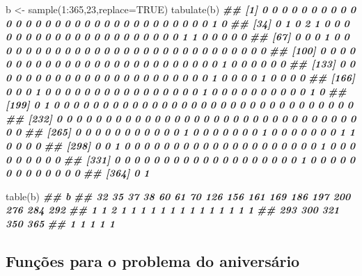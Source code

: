 \documentclass[
  11pt]{report}
\newenvironment{Shaded}{\begin{snugshade}}{\end{snugshade}}
\newcommand{\AttributeTok}[1]{\textcolor[rgb]{0.77,0.63,0.00}{#1}}
\newcommand{\ConstantTok}[1]{\textcolor[rgb]{0.00,0.00,0.00}{#1}}
\newcommand{\DecValTok}[1]{\textcolor[rgb]{0.00,0.00,0.81}{#1}}
\newcommand{\DocumentationTok}[1]{\textcolor[rgb]{0.56,0.35,0.01}{\textbf{\textit{#1}}}}
\newcommand{\FunctionTok}[1]{\textcolor[rgb]{0.00,0.00,0.00}{#1}}
\newcommand{\NormalTok}[1]{#1}
\newcommand{\OtherTok}[1]{\textcolor[rgb]{0.56,0.35,0.01}{#1}}
\newcommand{\SpecialCharTok}[1]{\textcolor[rgb]{0.00,0.00,0.00}{#1}}
\renewenvironment{Shaded}{
    \begin{mdframed}[%
      roundcorner=2pt,%
      innerleftmargin=5pt,%
      innerrightmargin=5pt,%
      topline=true,%
      leftline=true,%
      rightline=true,%
      bottomline=true,%
      linewidth=0.5pt,%
      linecolor=black!20,%
      backgroundcolor=black!2,%
      skipabove=2ex,%
      skipbelow=2.5ex%
    ]%
  }
  {
    \end{mdframed}
  }
\begin{document}
\begin{Shaded}
\begin{Highlighting}[]
\NormalTok{b }\OtherTok{\textless{}{-}} \FunctionTok{sample}\NormalTok{(}\DecValTok{1}\SpecialCharTok{:}\DecValTok{365}\NormalTok{,}\DecValTok{23}\NormalTok{,}\AttributeTok{replace=}\ConstantTok{TRUE}\NormalTok{)}
\FunctionTok{tabulate}\NormalTok{(b)}
\DocumentationTok{\#\#   [1] 0 0 0 0 0 0 0 0 0 0 0 0 0 0 0 0 0 0 0 0 0 0 0 0 0 0 0 0 0 0 0 1 0}
\DocumentationTok{\#\#  [34] 0 1 0 2 1 0 0 0 0 0 0 0 0 0 0 0 0 0 0 0 0 0 0 0 0 0 1 1 0 0 0 0 0}
\DocumentationTok{\#\#  [67] 0 0 0 1 0 0 0 0 0 0 0 0 0 0 0 0 0 0 0 0 0 0 0 0 0 0 0 0 0 0 0 0 0}
\DocumentationTok{\#\# [100] 0 0 0 0 0 0 0 0 0 0 0 0 0 0 0 0 0 0 0 0 0 0 0 0 0 0 1 0 0 0 0 0 0}
\DocumentationTok{\#\# [133] 0 0 0 0 0 0 0 0 0 0 0 0 0 0 0 0 0 0 0 0 0 0 0 1 0 0 0 0 1 0 0 0 0}
\DocumentationTok{\#\# [166] 0 0 0 1 0 0 0 0 0 0 0 0 0 0 0 0 0 0 0 0 1 0 0 0 0 0 0 0 0 0 0 1 0}
\DocumentationTok{\#\# [199] 0 1 0 0 0 0 0 0 0 0 0 0 0 0 0 0 0 0 0 0 0 0 0 0 0 0 0 0 0 0 0 0 0}
\DocumentationTok{\#\# [232] 0 0 0 0 0 0 0 0 0 0 0 0 0 0 0 0 0 0 0 0 0 0 0 0 0 0 0 0 0 0 0 0 0}
\DocumentationTok{\#\# [265] 0 0 0 0 0 0 0 0 0 0 0 1 0 0 0 0 0 0 0 1 0 0 0 0 0 0 0 1 1 0 0 0 0}
\DocumentationTok{\#\# [298] 0 0 1 0 0 0 0 0 0 0 0 0 0 0 0 0 0 0 0 0 0 0 0 1 0 0 0 0 0 0 0 0 0}
\DocumentationTok{\#\# [331] 0 0 0 0 0 0 0 0 0 0 0 0 0 0 0 0 0 0 0 1 0 0 0 0 0 0 0 0 0 0 0 0 0}
\DocumentationTok{\#\# [364] 0 1}
\end{Highlighting}
\end{Shaded}

\begin{Shaded}
\begin{Highlighting}[]
\FunctionTok{table}\NormalTok{(b)}
\DocumentationTok{\#\# b}
\DocumentationTok{\#\#  32  35  37  38  60  61  70 126 156 161 169 186 197 200 276 284 292 }
\DocumentationTok{\#\#   1   1   2   1   1   1   1   1   1   1   1   1   1   1   1   1   1 }
\DocumentationTok{\#\# 293 300 321 350 365 }
\DocumentationTok{\#\#   1   1   1   1   1}
\end{Highlighting}
\end{Shaded}

\hypertarget{funuxe7uxf5es-para-o-problema-do-aniversuxe1rio}{%
\subsection*{Funções para o problema do aniversário}\label{funuxe7uxf5es-para-o-problema-do-aniversuxe1rio}}
\end{document}
